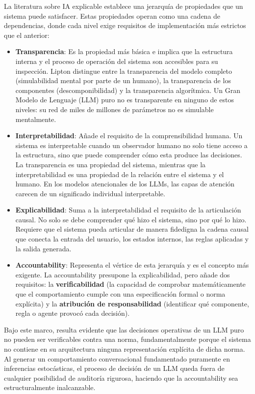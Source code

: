 \documentclass[12pt,a4paper]{report}
\begin{document}
La literatura sobre IA explicable establece una jerarquía de propiedades que un sistema puede satisfacer. Estas propiedades operan como una cadena de dependencias, donde cada nivel exige requisitos de implementación más estrictos que el anterior:

\begin{itemize}
    \item \textbf{Transparencia}: Es la propiedad más básica e implica que la estructura interna y el proceso de operación del sistema son accesibles para su inspección. Lipton \cite{lipton2018mythos} distingue entre la transparencia del modelo completo (simulabilidad mental por parte de un humano), la transparencia de los componentes (descomponibilidad) y la transparencia algorítmica. Un Gran Modelo de Lenguaje (LLM) puro no es transparente en ninguno de estos niveles: su red de miles de millones de parámetros no es simulable mentalmente.

    \item \textbf{Interpretabilidad}: Añade el requisito de la comprensibilidad humana. Un sistema es interpretable cuando un observador humano no solo tiene acceso a la estructura, sino que puede comprender cómo esta produce las decisiones. La transparencia es una propiedad del sistema, mientras que la interpretabilidad es una propiedad de la relación entre el sistema y el humano. En los modelos atencionales de los LLMs, las capas de atención carecen de un significado individual interpretable.

    \item \textbf{Explicabilidad}: Suma a la interpretabilidad el requisito de la articulación causal. No solo se debe comprender qué hizo el sistema, sino por qué lo hizo. Requiere que el sistema pueda articular de manera fidedigna la cadena causal que conecta la entrada del usuario, los estados internos, las reglas aplicadas y la salida generada.

    \item \textbf{Accountability}: Representa el vértice de esta jerarquía y es el concepto más exigente. La accountability presupone la explicabilidad, pero añade dos requisitos: la \textbf{verificabilidad} (la capacidad de comprobar matemáticamente que el comportamiento cumple con una especificación formal o norma explícita) y la \textbf{atribución de responsabilidad} (identificar qué componente, regla o agente provocó cada decisión).
\end{itemize}

Bajo este marco, resulta evidente que las decisiones operativas de un LLM puro no pueden ser verificables contra una norma, fundamentalmente porque el sistema no contiene en su arquitectura ninguna representación explícita de dicha norma. Al generar un comportamiento conversacional fundamentado puramente en inferencias estocásticas, el proceso de decisión de un LLM queda fuera de cualquier posibilidad de auditoría rigurosa, haciendo que la accountability sea estructuralmente inalcanzable.
\end{document}

